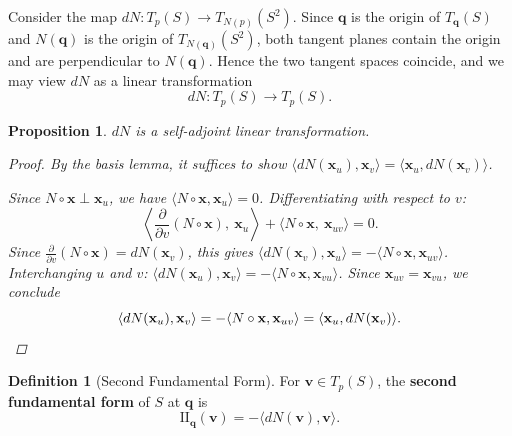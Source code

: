 \documentclass[10pt, a4paper]{article}
\theoremstyle{plain}
\newtheorem{proposition}[theorem]{Proposition}
\theoremstyle{definition}
\newtheorem{definition}[theorem]{Definition}
\theoremstyle{remark}
\begin{document}
Consider the map $dN: T_p(S) \to T_{N(p)}(S^2)$. Since $\mathbf{q}$ is the origin of
$T_{\mathbf{q}}(S)$ and $N(\mathbf{q})$ is the origin of $T_{N(\mathbf{q})}(S^2)$, both
tangent planes contain the origin and are perpendicular to $N(\mathbf{q})$. Hence the two
tangent spaces coincide, and we may view $dN$ as a linear transformation
\[
  dN : T_p(S) \to T_p(S).
\]

\begin{proposition}
  $dN$ is a self-adjoint linear transformation.

  \begin{proof}
  By the basis lemma, it suffices to show
  $\langle dN(\mathbf{x}_u), \mathbf{x}_v \rangle = \langle \mathbf{x}_u, dN(\mathbf{x}_v) \rangle$.

  Since $N \circ \mathbf{x} \perp \mathbf{x}_u$, we have $\langle N \circ \mathbf{x}, \mathbf{x}_u \rangle = 0$.
  Differentiating with respect to $v$:
  \[
    \left\langle \frac{\partial}{\partial v}(N \circ \mathbf{x}),\ \mathbf{x}_u \right\rangle
    + \langle N \circ \mathbf{x},\ \mathbf{x}_{uv} \rangle = 0.
  \]
  Since $\frac{\partial}{\partial v}(N \circ \mathbf{x}) = dN(\mathbf{x}_v)$, this gives
  $\langle dN(\mathbf{x}_v), \mathbf{x}_u \rangle = -\langle N \circ \mathbf{x}, \mathbf{x}_{uv} \rangle$.
  Interchanging $u$ and $v$:
  $\langle dN(\mathbf{x}_u), \mathbf{x}_v \rangle = -\langle N \circ \mathbf{x}, \mathbf{x}_{vu} \rangle$.
  Since $\mathbf{x}_{uv} = \mathbf{x}_{vu}$, we conclude
  \[
    \langle dN(\mathbf{x}_u), \mathbf{x}_v \rangle
    = -\langle N \circ \mathbf{x}, \mathbf{x}_{uv} \rangle
    = \langle \mathbf{x}_u, dN(\mathbf{x}_v) \rangle. \qedhere
  \]
\end{proof}
\end{proposition}



\begin{definition}[Second Fundamental Form]{\label{def:sff}}
  For $\mathbf{v} \in T_p(S)$, the \textbf{second fundamental form} of $S$ at $\mathbf{q}$ is
  \[
    \mathrm{II}_{\mathbf{q}}(\mathbf{v}) = -\langle dN(\mathbf{v}), \mathbf{v} \rangle.
  \]
\end{definition}
\end{document}
